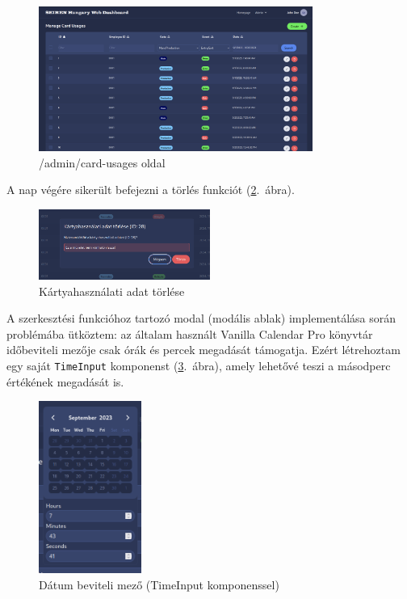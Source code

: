 \documentclass[a4paper]{article}
\newcommand{\inltxt}[1]{\texttt{#1}}
\begin{document}
\begin{figure}[ht]
  \centering
  \includegraphics[width = 0.8\textwidth]{images/manage_card_usages.png}
  \caption{/admin/card-usages oldal}
  \label{fig:admin_card_usages}
\end{figure}

A nap végére sikerült befejezni a törlés funkciót (\ref{fig:delete_card_usage}.~ábra). \\


\begin{figure}[ht]
  \centering
  \includegraphics[clip, trim=40 0 40 0, width=0.5\textwidth]{images/delete_card_usage.png}
  \caption{Kártyahasználati adat törlése}
  \label{fig:delete_card_usage}
\end{figure}


A szerkesztési funkcióhoz tartozó modal
(modális ablak) implementálása során
problémába ütköztem: az általam
használt Vanilla Calendar Pro könyvtár időbeviteli mezője csak órák és percek megadását támogatja.
Ezért létrehoztam egy saját \inltxt{TimeInput} komponenst (\ref{fig:time_input}.~ábra), amely lehetővé teszi a másodperc értékének
megadását is.

\begin{figure}[ht]
  \centering
  \includegraphics[width = 0.3\textwidth]{images/time_input.png}
  \caption{Dátum beviteli mező (TimeInput komponenssel)}
  \label{fig:time_input}
\end{figure}
\end{document}
